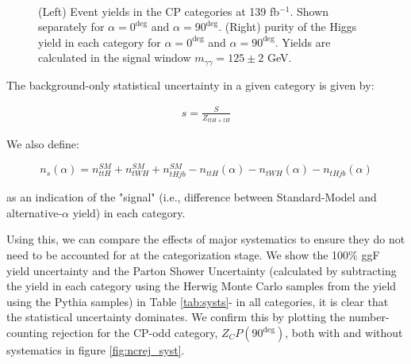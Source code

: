 \begin{figure}[htbp]
 \centering
         \\
  \caption{(Left) Event yields in the CP categories at 139 fb$^{-1}$. Shown separately for $\alpha = 0^{\deg}$ and $\alpha = 90^{\deg}$. (Right) purity of the Higgs yield in each category for $\alpha = 0^{\deg}$ and $\alpha = 90^{\deg}$. Yields are calculated in the signal window $m_{\gamma\gamma}=125\pm2$ GeV.}
  \label{fig:nominalb}
\end{figure}

The background-only statistical uncertainty in a given category is given by:

\begin{align}
s = \frac{S}{Z_{ttH+tH}}
\label{eq:statunc}
\end{align}

We also define:

\begin{equation}
n_{s}(\alpha) = n_{ttH}^{SM} + n_{tWH}^{SM} + n_{tHjb}^{SM} - n_{ttH}(\alpha) - n_{tWH}(\alpha) - n_{tHjb}(\alpha)
\end{equation}

as an indication of the "signal" (i.e., difference between Standard-Model and alternative-$\alpha$ yield) in each category. 

\begin{figure}
\end{figure}

Using this, we can compare the effects of major systematics to ensure they do not need to be accounted for at the categorization stage. We show the 100\% ggF yield uncertainty and the Parton Shower Uncertainty (calculated by subtracting the yield in each category using the Herwig Monte Carlo samples from the yield using the Pythia samples) in Table \ref{tab:systs}- in all categories, it is clear that the statistical uncertainty dominates. We confirm this by plotting the number-counting rejection for the CP-odd category, $Z_CP(90^{\deg})$, both with and without systematics in figure \ref{fig:ncrej_syst}. 


